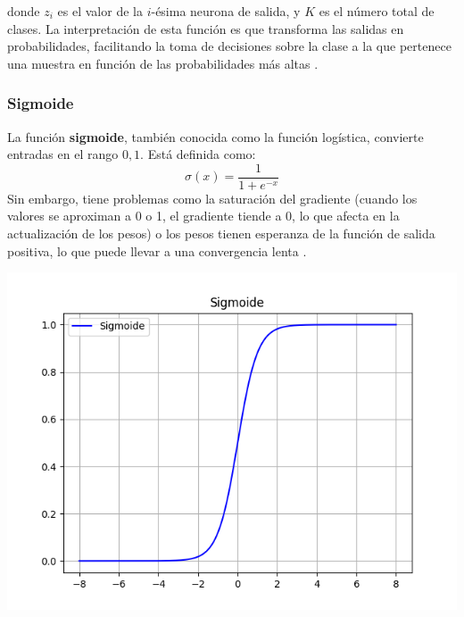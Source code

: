 donde \(z_i\) es el valor de la \(i\)-ésima neurona de salida, y \(K\) es el número total de clases. La interpretación de esta función es que transforma las salidas en probabilidades, facilitando la toma de decisiones sobre la clase a la que pertenece una muestra en función de las probabilidades más altas \citep{pajares2021aprendizaje}. 




\subsubsection*{Sigmoide}


\begin{minipage}{0.6\textwidth}
    La función \textbf{sigmoide}, también conocida como la función logística, convierte entradas en el rango \(0, 1\). Está definida como:
\begin{equation}
    \sigma(x) = \frac{1}{1 + e^{-x}} 
\end{equation}
Sin embargo, tiene problemas como la saturación del gradiente (cuando los valores se aproximan a 0 o 1, el gradiente tiende a 0, lo que afecta en la actualización de los pesos) o los pesos tienen esperanza de la función de salida positiva, lo que puede llevar a una convergencia lenta \citep{pajares2021aprendizaje}.
\end{minipage}
\begin{minipage}{0.05\textwidth}
\textbf{ }
\end{minipage}
\begin{minipage}{0.35\textwidth}
    \includegraphics[width=1.1\textwidth]{img/Sigmoide.png}
    \label{img: sigmoide}
\end{minipage}




